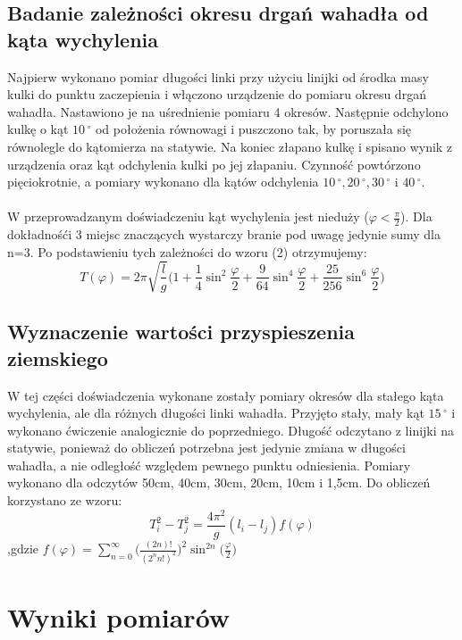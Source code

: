 \documentclass[a4paper,10pt]{article}
\begin{document}
\subsection{Badanie zależności okresu drgań wahadła od kąta wychylenia}
Najpierw wykonano pomiar długości linki przy użyciu linijki od środka masy kulki do punktu zaczepienia  i włączono urządzenie do pomiaru okresu drgań wahadła. Nastawiono je na uśrednienie pomiaru 4 okresów. Następnie odchylono kulkę o kąt $10\,^{\circ}$ od położenia równowagi i puszczono tak, by poruszała się równolegle do kątomierza na statywie. Na koniec złapano kulkę i spisano wynik z urządzenia oraz kąt odchylenia kulki po jej złapaniu. Czynność powtórzono pięciokrotnie, a pomiary wykonano dla kątów odchylenia  $10\,^{\circ}, 20\,^{\circ}, 30\,^{\circ}$ i $40\,^{\circ}$.
\\
\\W przeprowadzanym doświadczeniu kąt wychylenia jest nieduży ($\varphi<\frac{\pi}{2}$). Dla dokładnośći 3 miejsc znaczących wystarczy branie pod uwagę jedynie sumy dla n=3. Po podstawieniu tych zależności do wzoru (2) otrzymujemy:
\begin{equation}
T(\varphi) = 2\pi\sqrt{\frac{l}{g}}\bigg(1+\frac{1}{4}\sin^2\frac{\varphi}{2}+\frac{9}{64}\sin^4\frac{\varphi}{2}+\frac{25}{256}\sin^6\frac{\varphi}{2}\bigg)
\end{equation}

\subsection{Wyznaczenie wartości przyspieszenia ziemskiego}
W tej części doświadczenia wykonane zostały pomiary okresów dla stałego kąta wychylenia, ale dla różnych długości linki wahadła. Przyjęto stały, mały kąt $15\,^{\circ}$ i wykonano ćwiczenie analogicznie do poprzedniego. Długość odczytano z linijki na statywie, ponieważ do obliczeń potrzebna jest jedynie zmiana w długości wahadła, a nie odległość względem pewnego punktu odniesienia. Pomiary wykonano dla odczytów 50cm, 40cm, 30cm, 20cm, 10cm i 1,5cm. Do obliczeń korzystano ze wzoru:
\begin{equation}
T_i^2-T_j^2 = \frac{4\pi^2}{g}(l_i-l_j)f(\varphi)
\end{equation}
,gdzie $f(\varphi)=\sum_{n=0}^{\infty}\bigg(\frac{(2n)!}{(2^nn!)^2}\bigg)^2\sin^{2n}\bigg(\frac{\varphi}{2}\bigg)$

\section{Wyniki pomiarów}
\end{document}
